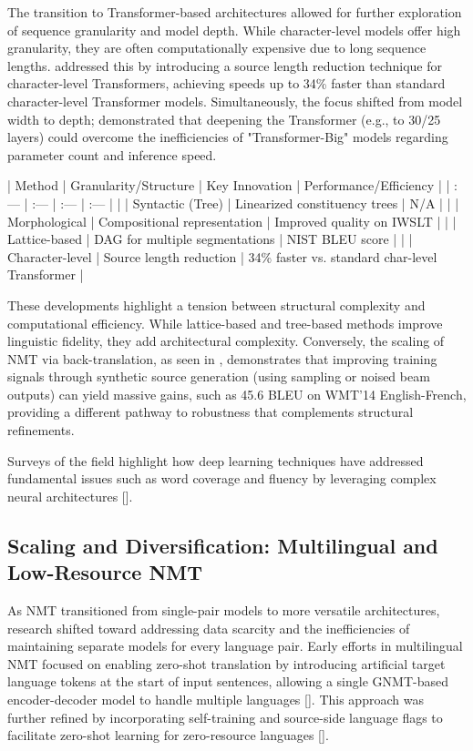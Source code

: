 \documentclass[11pt]{article}
\begin{document}
The transition to Transformer-based architectures allowed for further exploration of sequence granularity and model depth. While character-level models offer high granularity, they are often computationally expensive due to long sequence lengths. \citep{2005.11239} addressed this by introducing a source length reduction technique for character-level Transformers, achieving speeds up to 34\% faster than standard character-level Transformer models. Simultaneously, the focus shifted from model width to depth; \citep{1906.01787} demonstrated that deepening the Transformer (e.g., to 30/25 layers) could overcome the inefficiencies of "Transformer-Big" models regarding parameter count and inference speed.

| Method | Granularity/Structure | Key Innovation | Performance/Efficiency |
| :--- | :--- | :--- | :--- |
| \citep{1704.04743} | Syntactic (Tree) | Linearized constituency trees | N/A |
| \citep{1805.02036} | Morphological | Compositional representation | Improved quality on IWSLT |
| \citep{1906.01282} | Lattice-based | DAG for multiple segmentations | NIST BLEU score |
| \citep{2005.11239} | Character-level | Source length reduction | 34\% faster vs. standard char-level Transformer |

These developments highlight a tension between structural complexity and computational efficiency. While lattice-based and tree-based methods improve linguistic fidelity, they add architectural complexity. Conversely, the scaling of NMT via back-translation, as seen in \citep{1808.09381}, demonstrates that improving training signals through synthetic source generation (using sampling or noised beam outputs) can yield massive gains, such as 45.6 BLEU on WMT’14 English-French, providing a different pathway to robustness that complements structural refinements.

Surveys of the field highlight how deep learning techniques have addressed fundamental issues such as word coverage and fluency by leveraging complex neural architectures [\citep{2002.07526}].
\subsection{Scaling and Diversification: Multilingual and Low-Resource NMT}

As NMT transitioned from single-pair models to more versatile architectures, research shifted toward addressing data scarcity and the inefficiencies of maintaining separate models for every language pair. Early efforts in multilingual NMT focused on enabling zero-shot translation by introducing artificial target language tokens at the start of input sentences, allowing a single GNMT-based encoder-decoder model to handle multiple languages [\citep{1611.04558}]. This approach was further refined by incorporating self-training and source-side language flags to facilitate zero-shot learning for zero-resource languages [\citep{1909.07342}].
\end{document}
